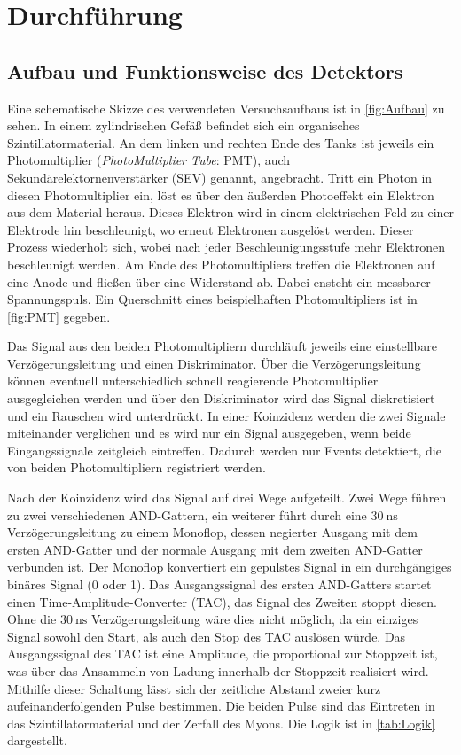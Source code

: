 \section{Durchführung}
\label{sec:Durchführung}
\subsection{Aufbau und Funktionsweise des Detektors}
\label{subsec:Aufbau}
Eine schematische Skizze des verwendeten Versuchsaufbaus ist in \autoref{fig:Aufbau} zu sehen. In einem zylindrischen Gefäß befindet sich ein organisches
Szintillatormaterial. An dem linken und rechten Ende des Tanks ist jeweils ein Photomultiplier (\textit{PhotoMultiplier Tube}: PMT), auch Sekundärelektornenverstärker (SEV) genannt, angebracht.
Tritt ein Photon in diesen Photomultiplier ein, löst es über den äußerden Photoeffekt ein Elektron aus dem Material heraus. Dieses Elektron wird in einem elektrischen Feld 
zu einer Elektrode hin beschleunigt, wo erneut Elektronen ausgelöst werden. Dieser Prozess wiederholt sich, wobei nach jeder Beschleunigungsstufe mehr Elektronen beschleunigt werden.
Am Ende des Photomultipliers treffen die Elektronen auf eine Anode und fließen über eine Widerstand ab. Dabei ensteht ein messbarer Spannungspuls. Ein Querschnitt eines beispielhaften
Photomultipliers ist in \autoref{fig:PMT} gegeben.

Das Signal aus den beiden Photomultipliern durchläuft jeweils eine einstellbare Verzögerungsleitung und einen Diskriminator. Über die Verzögerungsleitung können eventuell unterschiedlich
schnell reagierende Photomultiplier ausgegleichen werden und über den Diskriminator wird das Signal diskretisiert und ein Rauschen wird unterdrückt. In einer Koinzidenz werden die zwei 
Signale miteinander verglichen und es wird nur ein Signal ausgegeben, wenn beide Eingangssignale zeitgleich eintreffen. Dadurch werden nur Events detektiert, die von beiden
Photomultipliern registriert werden.

Nach der Koinzidenz wird das Signal auf drei Wege aufgeteilt. Zwei Wege führen zu zwei verschiedenen AND-Gattern, ein weiterer führt durch eine $\qty{30}{\nano\second}$ Verzögerungsleitung 
zu einem Monoflop, dessen negierter Ausgang mit dem ersten AND-Gatter und der normale Ausgang mit dem zweiten AND-Gatter verbunden ist. 
Der Monoflop konvertiert ein gepulstes Signal in ein durchgängiges binäres Signal (0 oder 1). Das Ausgangssignal des ersten AND-Gatters startet 
einen Time-Amplitude-Converter (TAC), das Signal des Zweiten stoppt diesen.
Ohne die $\qty{30}{\nano\second}$ Verzögerungsleitung wäre dies nicht möglich, da ein einziges Signal sowohl den Start, als auch den Stop des TAC auslösen würde.
Das Ausgangssignal des TAC ist eine Amplitude, die proportional zur Stoppzeit ist, was über das Ansammeln von Ladung innerhalb der Stoppzeit realisiert wird.
Mithilfe dieser Schaltung lässt sich der zeitliche Abstand zweier kurz aufeinanderfolgenden Pulse bestimmen.
Die beiden Pulse sind das Eintreten in das Szintillatormaterial und der Zerfall des Myons. Die Logik ist in \autoref{tab:Logik} dargestellt.

